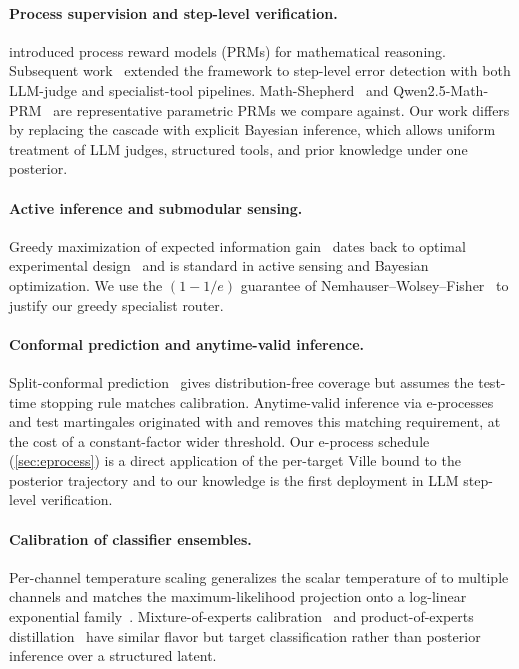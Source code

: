\documentclass[11pt,a4paper]{article}
\theoremstyle{plain}
\theoremstyle{definition}
\theoremstyle{remark}
\begin{document}
\paragraph{Process supervision and step-level verification.}
\citet{lightman2024lets} introduced process reward models (PRMs) for
mathematical reasoning. Subsequent work~\citep{uesato2022solving,
zheng2024processbench, tyen2024llms, wang2024mathshepherd} extended
the framework to step-level error detection with both LLM-judge and
specialist-tool pipelines. Math-Shepherd~\citep{wang2024mathshepherd}
and Qwen2.5-Math-PRM~\citep{zheng2024processbench} are
representative parametric PRMs we compare against. Our work differs
by replacing the cascade with explicit Bayesian inference, which
allows uniform treatment of LLM judges, structured tools, and prior
knowledge under one posterior.

\paragraph{Active inference and submodular sensing.}
Greedy maximization of expected information
gain~\citep{krause2005nearoptimal} dates back to optimal experimental
design~\citep{lindley1956measure} and is standard in active sensing
and Bayesian optimization. We use the $(1-1/e)$ guarantee of
Nemhauser--Wolsey--Fisher~\citep{nemhauser1978analysis} to justify
our greedy specialist router.

\paragraph{Conformal prediction and anytime-valid inference.}
Split-conformal prediction~\citep{vovk2005algorithmic,
angelopoulos2023conformal} gives distribution-free coverage but
assumes the test-time stopping rule matches calibration. Anytime-valid
inference via e-processes~\citep{howard2021timeuniform,
ramdas2023game} and test martingales originated with
\citet{ville1939etude} and removes this matching requirement, at the
cost of a constant-factor wider threshold. Our e-process schedule
(\cref{sec:eprocess}) is a direct application of the per-target Ville
bound to the posterior trajectory and to our knowledge is the first
deployment in LLM step-level verification.

\paragraph{Calibration of classifier ensembles.}
Per-channel temperature scaling generalizes the scalar temperature of
\citet{guo2017calibration} to multiple channels and matches the
maximum-likelihood projection onto a log-linear exponential
family~\citep{wainwright2008graphical}. Mixture-of-experts
calibration~\citep{jiang2012calibrating} and product-of-experts
distillation~\citep{hinton2002training} have similar flavor but target
classification rather than posterior inference over a structured
latent.
\end{document}
